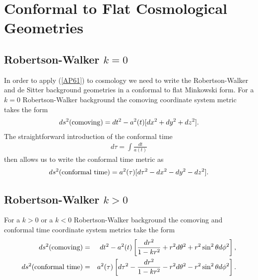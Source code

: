 
\chapter{Conformal to Flat Cosmological Geometries}
\label{ab:cosmologies}

\section{Robertson-Walker $k=0$}
\label{abs:rw_k=0}

In order to apply (\ref{AP61}) to cosmology we need to write the Robertson-Walker and de Sitter background geometries in a conformal to flat Minkowski form. For a $k=0$ Robertson-Walker background the comoving coordinate system metric takes the form
% 
\begin{eqnarray}
ds^2({\rm comoving})=dt^2-a^2(t)[dx^2+dy^2+dz^2].
\label{A}
\end{eqnarray}
%
The straightforward introduction of the conformal time
% 
\begin{eqnarray}
d\tau=\int \frac{dt}{a(t)}
\label{A2}
\end{eqnarray}
%
then allows us to write the conformal time metric as
% 
\begin{eqnarray}
ds^2({\rm conformal~time})=a^2(\tau)[d\tau^2-dx^2-dy^2-dz^2].
\label{A3}
\end{eqnarray}
%
\section{Robertson-Walker $k>0$}
\label{abs:rw_klt0}

For a $k>0$ or a $k<0$ Robertson-Walker background the comoving and conformal time coordinate system metrics take the form
% 
\begin{eqnarray}
ds^2({\rm comoving})&=&dt^2-a^2(t)\left[\frac{dr^2}{1-kr^2}+r^2d\theta^2+r^2\sin^2\theta d\phi^2\right],
\nonumber\\
ds^2({\rm conformal~time})&=&a^2(\tau)\left[d\tau^2-\frac{dr^2}{1-kr^2}-r^2d\theta^2-r^2\sin^2\theta d\phi^2\right].
\label{A4}
\end{eqnarray}
%


